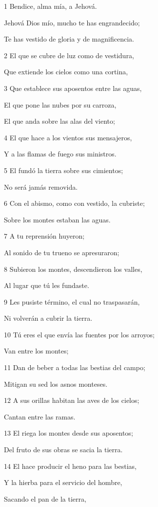 \par 1 Bendice, alma mía, a Jehová.
\par Jehová Dios mío, mucho te has engrandecido;
\par Te has vestido de gloria y de magnificencia.
\par 2 El que se cubre de luz como de vestidura,
\par Que extiende los cielos como una cortina,
\par 3 Que establece sus aposentos entre las aguas,
\par El que pone las nubes por su carroza,
\par El que anda sobre las alas del viento;
\par 4 El que hace a los vientos sus mensajeros,
\par Y a las flamas de fuego sus ministros.
\par 5 El fundó la tierra sobre sus cimientos;
\par No será jamás removida.
\par 6 Con el abismo, como con vestido, la cubriste;
\par Sobre los montes estaban las aguas.
\par 7 A tu reprensión huyeron;
\par Al sonido de tu trueno se apresuraron;
\par 8 Subieron los montes, descendieron los valles,
\par Al lugar que tú les fundaste.
\par 9 Les pusiste término, el cual no traspasarán,
\par Ni volverán a cubrir la tierra.
\par 10 Tú eres el que envía las fuentes por los arroyos;
\par Van entre los montes;
\par 11 Dan de beber a todas las bestias del campo;
\par Mitigan su sed los asnos monteses.
\par 12 A sus orillas habitan las aves de los cielos;
\par Cantan entre las ramas.
\par 13 El riega los montes desde sus aposentos;
\par Del fruto de sus obras se sacia la tierra.
\par 14 El hace producir el heno para las bestias,
\par Y la hierba para el servicio del hombre,
\par Sacando el pan de la tierra,
